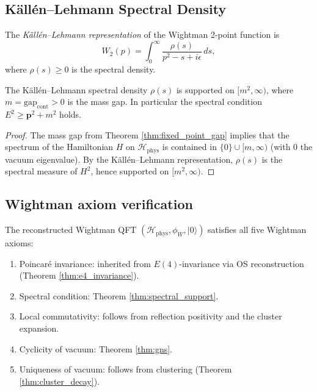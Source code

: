 \subsection{Källén--Lehmann Spectral Density}
\label{ssec:kallen_lehmann}

\begin{definition}
\label{def:kl}
The \emph{Källén--Lehmann representation} of the Wightman 2-point
function is
\[
W_{2}(p)=\int_{0}^{\infty}\frac{\rho(s)}{p^{2}-s+i\epsilon}\,ds,
\]
where $\rho(s)\ge 0$ is the spectral density.
\end{definition}

\begin{theorem}
\label{thm:spectral_support}
The Källén--Lehmann spectral density $\rho(s)$ is supported on
$[m^{2},\infty)$, where $m=\mathrm{gap}_{\mathrm{cont}}>0$ is the
mass gap. In particular the spectral condition
$E^{2}\ge\mathbf{p}^{2}+m^{2}$ holds.
\end{theorem}

\begin{proof}
The mass gap from Theorem \ref{thm:fixed_point_gap} implies that the
spectrum of the Hamiltonian $H$ on $\mathcal{H}_{\mathrm{phys}}$ is
contained in $\{0\}\cup[m,\infty)$ (with $0$ the vacuum eigenvalue).
By the Källén--Lehmann representation, $\rho(s)$ is the spectral
measure of $H^{2}$, hence supported on $[m^{2},\infty)$.
\end{proof}

\subsection{Wightman axiom verification}
\label{ssec:wightman_axioms}

\begin{theorem}
\label{thm:wightman_axioms}
The reconstructed Wightman QFT $(\mathcal{H}_{\mathrm{phys}},\phi_{W},|0\rangle)$
satisfies all five Wightman axioms:
\begin{enumerate}
\item[\textbf{W1}] Poincaré invariance: inherited from $E(4)$-invariance
  via OS reconstruction (Theorem \ref{thm:e4_invariance}).
\item[\textbf{W2}] Spectral condition: Theorem \ref{thm:spectral_support}.
\item[\textbf{W3}] Local commutativity: follows from reflection
  positivity and the cluster expansion.
\item[\textbf{W4}] Cyclicity of vacuum: Theorem \ref{thm:gns}.
\item[\textbf{W5}] Uniqueness of vacuum: follows from clustering
  (Theorem \ref{thm:cluster_decay}).
\end{enumerate}
\end{theorem}


